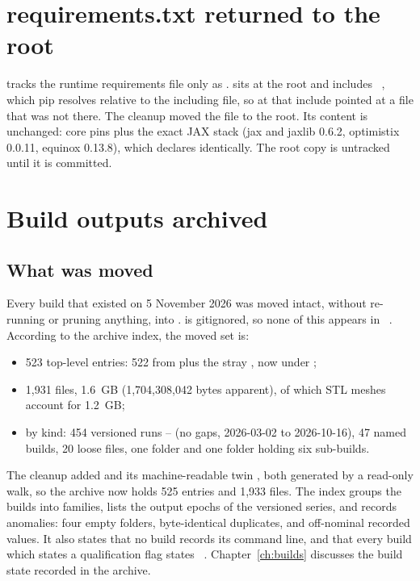 \section{requirements.txt returned to the root}\label{sec:cl-req}
 tracks the runtime requirements file only as .  sits at the root and includes ~, which pip resolves relative to the including file, so at  that include pointed at a file that was not there. The cleanup moved the file to the root. Its content is unchanged: core pins plus the exact JAX stack (jax and jaxlib 0.6.2, optimistix 0.0.11, equinox 0.13.8), which  declares identically. The root copy is untracked until it is committed.

\section{Build outputs archived}\label{sec:cl-builds}

\subsection{What was moved}
Every build that existed on 5 November 2026 was moved intact, without re-running or pruning anything, into .  is gitignored, so none of this appears in ~. According to the archive index, the moved set is:
\begin{itemize}
  \item 523 top-level entries: 522 from  plus the stray , now under ;
  \item 1,931 files, 1.6~GB (1,704,308,042 bytes apparent), of which STL meshes account for 1.2~GB;
  \item by kind: 454 versioned runs -- (no gaps, 2026-03-02 to 2026-10-16), 47 named builds, 20 loose files, one  folder and one  folder holding six sub-builds.
\end{itemize}
The cleanup added  and its machine-readable twin , both generated by a read-only walk, so the archive now holds 525 entries and 1,933 files. The index groups the builds into families, lists the output epochs of the versioned series, and records anomalies: four empty folders, byte-identical duplicates, and off-nominal recorded values. It also states that no build records its command line, and that every build which states a qualification flag states ~. Chapter~\ref{ch:builds} discusses the build state recorded in the archive.

